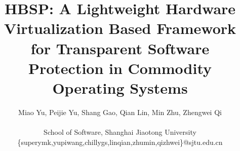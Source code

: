 \documentclass[conference]{IEEEtran}
\begin{document}
%
\title{HBSP: A Lightweight Hardware Virtualization Based Framework for Transparent Software Protection in Commodity Operating Systems}


\iffalse
\author{
\IEEEauthorblockN{Miao Yu}
\IEEEauthorblockA{School of Software,\\Shanghai Jiaotong University\\
Email: yumiao@sjtu.edu.cn}
\and
\IEEEauthorblockN{Peijie Yu}
\IEEEauthorblockA{School of Software,\\Shanghai Jiaotong University\\
Email: yupeijie@sjtu.edu.cn} \and \IEEEauthorblockN{Shang Gao}
\IEEEauthorblockA{School of Software,\\Shanghai Jiaotong
University\\Email: gaoshang@sjtu.edu.cn}}
\fi

\author{Miao Yu, Peijie Yu, Shang Gao, Qian Lin, Min Zhu, Zhengwei
Qi\\ \\
School of Software, Shanghai Jiaotong University\\
\{superymk,yupiwang,chillygs,linqian,zhumin,qizhwei\}@sjtu.edu.cn}


\maketitle
\end{document}
